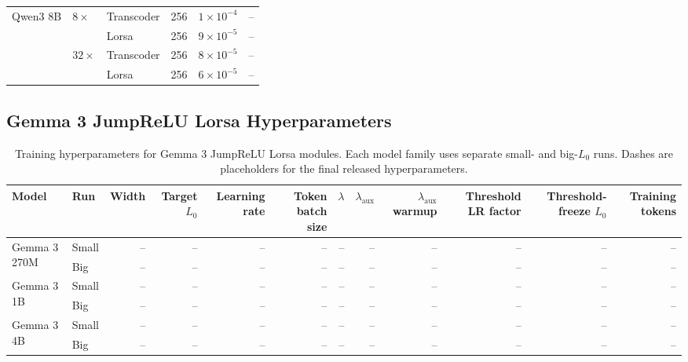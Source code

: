 \documentclass{article}
\begin{document}
\begin{table}[t]
\begin{adjustbox}{max width=\textwidth}
\begin{tabular}{lllccc}
        \multirow{4}{*}{Qwen3 8B}
        & \multirow{2}{*}{$8\times$}
        & Transcoder & 256 & $1{\times}10^{-4}$ & -- \\
        & & Lorsa & 256 & $9{\times}10^{-5}$ & -- \\
        \cmidrule(lr){2-6}
        & \multirow{2}{*}{$32\times$}
        & Transcoder & 256 & $8{\times}10^{-5}$ & -- \\
        & & Lorsa & 256 & $6{\times}10^{-5}$ & -- \\

        \bottomrule
    \end{tabular}
    \end{adjustbox}
\end{table}



\subsection{Gemma 3 JumpReLU Lorsa Hyperparameters}
\label{app:lorsa-hyperparameters}

\begin{table}[t]
    \centering
    \caption{
        Training hyperparameters for Gemma 3 JumpReLU Lorsa modules.
        Each model family uses separate small- and big-$L_0$ runs. Dashes are
        placeholders for the final released hyperparameters.
    }
    \label{tab:gemma_lorsa_hyperparameters}

    \footnotesize
    \renewcommand{\arraystretch}{1.05}
    \setlength{\tabcolsep}{5pt}

    \begin{adjustbox}{max width=\textwidth}
    \begin{tabular}{llrrrrrrrrrr}
        \toprule
        Model & Run & Width & Target $L_0$ & Learning rate & Token batch size
        & $\lambda$ & $\lambda_{\mathrm{aux}}$ & $\lambda_{\mathrm{aux}}$ warmup
        & Threshold LR factor & Threshold-freeze $L_0$ & Training tokens \\
        \midrule
        \multirow{2}{*}{Gemma 3 270M}
        & Small & -- & -- & -- & -- & -- & -- & -- & -- & -- & -- \\
        & Big   & -- & -- & -- & -- & -- & -- & -- & -- & -- & -- \\
        \midrule
        \multirow{2}{*}{Gemma 3 1B}
        & Small & -- & -- & -- & -- & -- & -- & -- & -- & -- & -- \\
        & Big   & -- & -- & -- & -- & -- & -- & -- & -- & -- & -- \\
        \midrule
        \multirow{2}{*}{Gemma 3 4B}
        & Small & -- & -- & -- & -- & -- & -- & -- & -- & -- & -- \\
        & Big   & -- & -- & -- & -- & -- & -- & -- & -- & -- & -- \\
        \bottomrule
    \end{tabular}
    \end{adjustbox}
\end{table}
\end{document}
